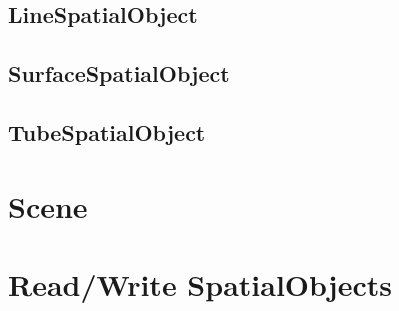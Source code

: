\subsection{LineSpatialObject}
\label{sec:LineSpatialObject}
\ifitkFullVersion 

\fi

\subsection{SurfaceSpatialObject}
\label{sec:SurfaceSpatialObject}
\ifitkFullVersion 

\fi

\subsection{TubeSpatialObject}
\label{sec:TubeSpatialObject}
\ifitkFullVersion 

\fi

\section{Scene}
\label{sec:Scene}
\ifitkFullVersion 

\fi

\section{Read/Write SpatialObjects}
\label{sec:ReadWriteSpatialObjects}
\ifitkFullVersion 

\fi
